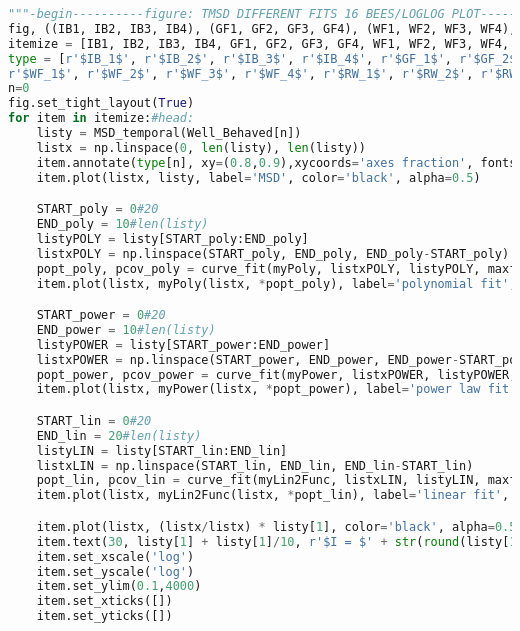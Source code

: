 \begin{lstlisting}[language=Python, basicstyle=\tiny, frame=single, keywordstyle=\color{teal}, commentstyle=\color{olive}, stringstyle=\color{red}]
"""-begin----------figure: TMSD DIFFERENT FITS 16 BEES/LOGLOG PLOT-----------"""
fig, ((IB1, IB2, IB3, IB4), (GF1, GF2, GF3, GF4), (WF1, WF2, WF3, WF4), (RW1, RW2, RW3, RW4)) = plt.subplots(4, 4, figsize=(10,10))
itemize = [IB1, IB2, IB3, IB4, GF1, GF2, GF3, GF4, WF1, WF2, WF3, WF4, RW1, RW2, RW3, RW4]
type = [r'$IB_1$', r'$IB_2$', r'$IB_3$', r'$IB_4$', r'$GF_1$', r'$GF_2$', r'$GF_3$', r'$GF_4$', 
r'$WF_1$', r'$WF_2$', r'$WF_3$', r'$WF_4$', r'$RW_1$', r'$RW_2$', r'$RW_3$', r'$RW_4$']
n=0
fig.set_tight_layout(True)
for item in itemize:#head:
    listy = MSD_temporal(Well_Behaved[n])
    listx = np.linspace(0, len(listy), len(listy))
    item.annotate(type[n], xy=(0.8,0.9),xycoords='axes fraction', fontsize=12)
    item.plot(listx, listy, label='MSD', color='black', alpha=0.5)

    START_poly = 0#20
    END_poly = 10#len(listy)
    listyPOLY = listy[START_poly:END_poly]
    listxPOLY = np.linspace(START_poly, END_poly, END_poly-START_poly)
    popt_poly, pcov_poly = curve_fit(myPoly, listxPOLY, listyPOLY, maxfev = 2000000, p0=(1, 350, 1))
    item.plot(listx, myPoly(listx, *popt_poly), label='polynomial fit', color='black', linestyle='dashed')

    START_power = 0#20
    END_power = 10#len(listy)
    listyPOWER = listy[START_power:END_power]
    listxPOWER = np.linspace(START_power, END_power, END_power-START_power)
    popt_power, pcov_power = curve_fit(myPower, listxPOWER, listyPOWER, maxfev = 2000000, p0=(1, 350, 1))
    item.plot(listx, myPower(listx, *popt_power), label='power law fit', color='red', linestyle='dashdot')

    START_lin = 0#20
    END_lin = 20#len(listy)
    listyLIN = listy[START_lin:END_lin]
    listxLIN = np.linspace(START_lin, END_lin, END_lin-START_lin)
    popt_lin, pcov_lin = curve_fit(myLin2Func, listxLIN, listyLIN, maxfev = 200000, p0=(1))
    item.plot(listx, myLin2Func(listx, *popt_lin), label='linear fit', color='blue', linestyle='dotted')#, linewidth=1)

    item.plot(listx, (listx/listx) * listy[1], color='black', alpha=0.5, linewidth=0.5, linestyle='dotted')
    item.text(30, listy[1] + listy[1]/10, r'$I = $' + str(round(listy[1], 3)))
    item.set_xscale('log')
    item.set_yscale('log')
    item.set_ylim(0.1,4000)
    item.set_xticks([])
    item.set_yticks([])


\end{lstlisting}

